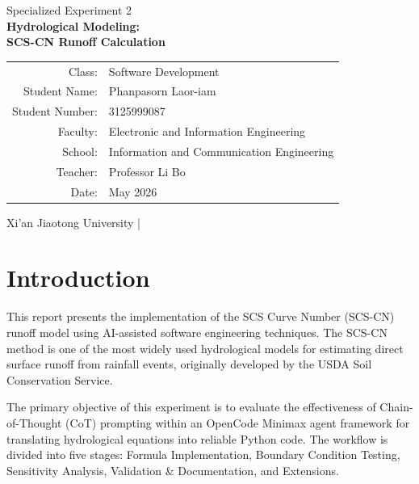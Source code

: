 \documentclass[12pt, a4paper]{article}
\begin{document}
\thispagestyle{empty}

\begin{center}
  \vspace*{1cm}
  {\large Specialized Experiment 2}\\[0.5cm]
  {\LARGE\bfseries Hydrological Modeling:\\[0.3cm]
  SCS-CN Runoff Calculation}\\[1.5cm]

  \begin{tabular}{rl}
    Class:          & Software Development \\[2pt]
    Student Name:   & Phanpasorn Laor-iam \\[2pt]
    Student Number: & 3125999087 \\[2pt]
    Faculty:        & Electronic and Information Engineering \\[2pt]
    School:         & Information and Communication Engineering \\[2pt]
    Teacher:        & Professor Li Bo \\[2pt]
    Date:           & May 2026 \\
  \end{tabular}

  \vfill
  Xi'an Jiaotong University \quad|
\end{center}

\newpage
\pagestyle{fancy}

\tableofcontents
\newpage

\section{Introduction}

This report presents the implementation of the SCS Curve Number (SCS-CN) runoff model using AI-assisted software engineering techniques. The SCS-CN method is one of the most widely used hydrological models for estimating direct surface runoff from rainfall events, originally developed by the USDA Soil Conservation Service.

The primary objective of this experiment is to evaluate the effectiveness of Chain-of-Thought (CoT) prompting within an OpenCode Minimax agent framework for translating hydrological equations into reliable Python code. The workflow is divided into five stages: Formula Implementation, Boundary Condition Testing, Sensitivity Analysis, Validation \& Documentation, and Extensions.
\end{document}
